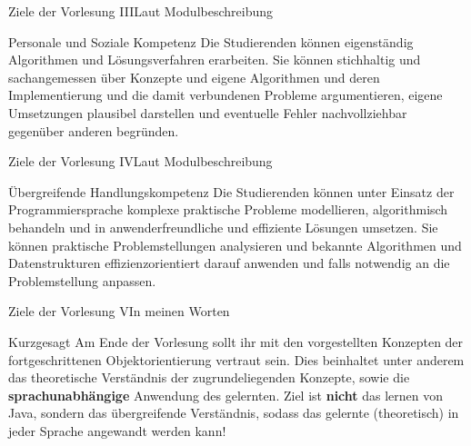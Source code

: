\begin{frame}{Ziele der Vorlesung III}{Laut Modulbeschreibung}	
	\vfill
	\begin{block}{Personale und Soziale Kompetenz}
		Die Studierenden können eigenständig Algorithmen und Lösungsverfahren erarbeiten. Sie können stichhaltig und sachangemessen über Konzepte und eigene Algorithmen und deren Implementierung 
		und die damit verbundenen Probleme argumentieren, eigene Umsetzungen plausibel darstellen und eventuelle Fehler nachvollziehbar gegenüber anderen begründen.
	\end{block}
	\vfill
\end{frame}
	
\begin{frame}{Ziele der Vorlesung IV}{Laut Modulbeschreibung}
	\vfill
	\begin{block}{Übergreifende Handlungskompetenz}
		Die Studierenden können unter Einsatz der Programmiersprache komplexe praktische Probleme modellieren, algorithmisch behandeln und in anwenderfreundliche und effiziente Lösungen umsetzen. Sie 
		können praktische Problemstellungen analysieren und bekannte Algorithmen und Datenstrukturen effizienzorientiert darauf anwenden und falls notwendig an die Problemstellung anpassen.
	\end{block}
	\vfill
\end{frame}

\begin{frame}{Ziele der Vorlesung V}{In meinen Worten}
	\vfill
	\begin{alertblock}{Kurzgesagt}
		Am Ende der Vorlesung sollt ihr mit den vorgestellten Konzepten der fortgeschrittenen Objektorientierung vertraut sein. Dies beinhaltet unter anderem das theoretische Verständnis der zugrundeliegenden Konzepte,
		sowie die \textbf{sprachunabhängige} Anwendung des gelernten. Ziel ist \textbf{nicht} das lernen von Java, sondern das übergreifende Verständnis, sodass das gelernte (theoretisch) in jeder Sprache angewandt werden kann!
	\end{alertblock}
	\vfill
\end{frame}

